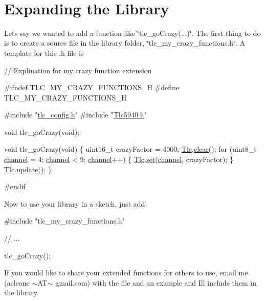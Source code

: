 ~\hypertarget{index_expansion}{}\section{Expanding the Library}\label{index_expansion}
Lets say we wanted to add a function like \char`\"{}tlc\+\_\+go\+Crazy(...)\char`\"{}. The first thing to do is to create a source file in the library folder, \char`\"{}tlc\+\_\+my\+\_\+crazy\+\_\+functions.\+h\char`\"{}. A template for this .h file is 
\begin{DoxyCode}
\textcolor{comment}{// Explination for my crazy function extension}

\textcolor{preprocessor}{#ifndef TLC\_MY\_CRAZY\_FUNCTIONS\_H}
\textcolor{preprocessor}{#define TLC\_MY\_CRAZY\_FUNCTIONS\_H}

\textcolor{preprocessor}{#include "\hyperlink{tlc__config_8h}{tlc\_config.h}"}
\textcolor{preprocessor}{#include "\hyperlink{Tlc5940_8h}{Tlc5940.h}"}

\textcolor{keywordtype}{void} tlc\_goCrazy(\textcolor{keywordtype}{void});

\textcolor{keywordtype}{void} tlc\_goCrazy(\textcolor{keywordtype}{void})
\{
    uint16\_t crazyFactor = 4000;
    \hyperlink{Tlc5940_8cpp_a4a520693b05c8dcd19ef500540a8b75e}{Tlc}.\hyperlink{group__CoreFunctions_ga5e5acd62f0c91579694ed4cffd88bd76}{clear}();
    \textcolor{keywordflow}{for} (uint8\_t \hyperlink{structTlc__Fade_a7fe3f4f2ae4c22eede7e36a39cf67bf6}{channel} = 4; \hyperlink{structTlc__Fade_a7fe3f4f2ae4c22eede7e36a39cf67bf6}{channel} < 9; \hyperlink{structTlc__Fade_a7fe3f4f2ae4c22eede7e36a39cf67bf6}{channel}++) \{
        \hyperlink{Tlc5940_8cpp_a4a520693b05c8dcd19ef500540a8b75e}{Tlc}.\hyperlink{group__CoreFunctions_ga3d487c503365fa5b948b6711b9dac73e}{set}(\hyperlink{structTlc__Fade_a7fe3f4f2ae4c22eede7e36a39cf67bf6}{channel}, crazyFactor);
    \}
    \hyperlink{Tlc5940_8cpp_a4a520693b05c8dcd19ef500540a8b75e}{Tlc}.\hyperlink{group__CoreFunctions_ga18ee51310250855d75cff715a5ff4d48}{update}();
\}

\textcolor{preprocessor}{#endif}
\end{DoxyCode}
 Now to use your library in a sketch, just add 
\begin{DoxyCode}
\textcolor{preprocessor}{#include "tlc\_my\_crazy\_functions.h"}

\textcolor{comment}{// ...}

tlc\_goCrazy();
\end{DoxyCode}
 If you would like to share your extended functions for others to use, email me (acleone $\sim$\+A\+T$\sim$ gmail.\+com) with the file and an example and I\textquotesingle{}ll include them in the library.

